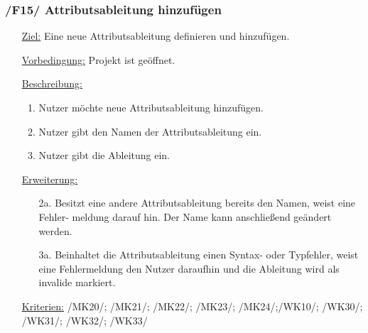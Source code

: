 \documentclass{article}
\begin{document}
\subsubsection*{\textbf{/F15/} Attributsableitung hinzufügen} \label{sec:f:Attributsableitung hinzufügen}
\begin{itemize}
    \item[\underline{Ziel:}] Eine neue Attributsableitung definieren und hinzufügen. 
    \item[\underline{Vorbedingung:}] Projekt ist geöffnet.
    \item[\underline{Beschreibung:}]
    \begin{enumerate}
        \item Nutzer möchte neue Attributsableitung hinzufügen.
        \item Nutzer gibt den Namen der Attributsableitung ein.
        \item Nutzer gibt die Ableitung ein.
    \end{enumerate}
    \item[\underline{Erweiterung:}]
    \begin{itemize}
        \item[2a.] Besitzt eine andere Attributsableitung bereits den Namen, weist eine Fehler-
        meldung darauf hin. Der Name kann anschließend geändert werden.
        \item[3a.] Beinhaltet die Attributsableitung einen Syntax- oder Typfehler, weist eine Fehlermeldung den Nutzer daraufhin und die Ableitung wird als invalide markiert. 
    \end{itemize}
    \item[\underline{Kriterien:}] /MK20/; /MK21/; /MK22/; /MK23/; /MK24/;\newline/WK10/; /WK30/; /WK31/; /WK32/; /WK33/
\end{itemize}
\end{document}
